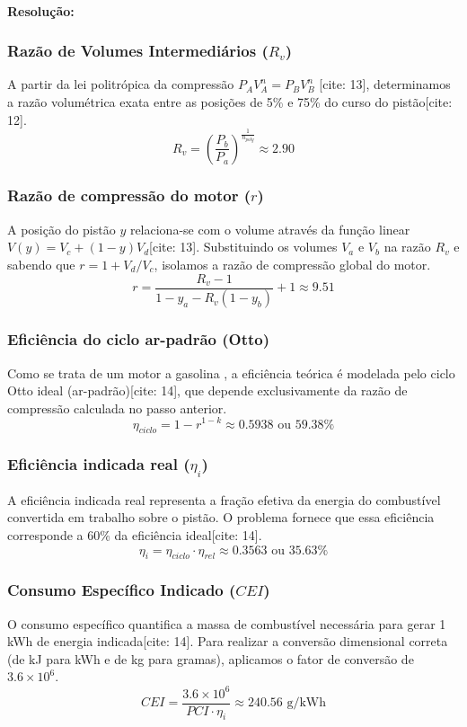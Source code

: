 \paragraph{Resolução:}

\subsubsection*{Razão de Volumes Intermediários ($R_v$)}
\noindent A partir da lei politrópica da compressão $P_A V_A^n = P_B V_B^n$ [cite: 13], determinamos a razão volumétrica exata entre as posições de 5\% e 75\% do curso do pistão[cite: 12].
\[ R_{v} = \left(\frac{P_{b}}{P_{a}}\right)^{\frac{1}{n_{poly}}} \approx 2.90 \]
\vspace{6pt}

\subsubsection*{Razão de compressão do motor ($r$)}
\noindent A posição do pistão $y$ relaciona-se com o volume através da função linear $V(y) = V_c + (1-y)V_d$[cite: 13]. Substituindo os volumes $V_a$ e $V_b$ na razão $R_v$ e sabendo que $r = 1 + V_d/V_c$, isolamos a razão de compressão global do motor.
\[ r = \frac{R_{v} - 1}{1 - y_a - R_{v} \left(1 - y_{b}\right)} + 1 \approx 9.51 \]
\vspace{6pt}

\subsubsection*{Eficiência do ciclo ar-padrão (Otto)}
\noindent Como se trata de um motor a gasolina , a eficiência teórica é modelada pelo ciclo Otto ideal (ar-padrão)[cite: 14], que depende exclusivamente da razão de compressão calculada no passo anterior.
\[ \eta_{ciclo} = 1 - r^{1 - k} \approx 0.5938 \text{ ou } 59.38\% \]
\vspace{6pt}

\subsubsection*{Eficiência indicada real ($\eta_i$)}
\noindent A eficiência indicada real representa a fração efetiva da energia do combustível convertida em trabalho sobre o pistão. O problema fornece que essa eficiência corresponde a 60\% da eficiência ideal[cite: 14].
\[ \eta_{i} = \eta_{ciclo} \cdot \eta_{rel} \approx 0.3563 \text{ ou } 35.63\% \]
\vspace{6pt}

\subsubsection*{Consumo Específico Indicado ($CEI$)}
\noindent O consumo específico quantifica a massa de combustível necessária para gerar 1 kWh de energia indicada[cite: 14]. Para realizar a conversão dimensional correta (de kJ para kWh e de kg para gramas), aplicamos o fator de conversão de $3.6 \times 10^6$.
\[ CEI = \frac{3.6 \times 10^6}{PCI \cdot \eta_{i}} \approx 240.56 \text{ g/kWh} \]
\vspace{6pt}

\newpage